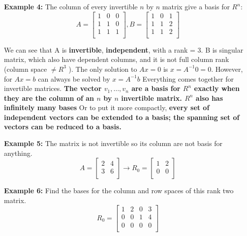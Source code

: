 \textbf{Example 4:} The column of every invertible \(n\) by \(n\) matrix give a basis for \(R^n\):
\[
    A =
    \begin{bmatrix}
        1 & 0 & 0  \\
        1 & 1 & 0  \\
        1 & 1 & 1  \\
    \end{bmatrix}
    , B = 
    \begin{bmatrix}
        1 & 0 & 1  \\
        1 & 1 & 2  \\
        1 & 1 & 2  \\
    \end{bmatrix}
\]    

We can see that A is \textbf{invertible}, \textbf{independent}, with a rank = 3. B is singular matrix, which also have dependent columns, and it is not full column rank (column space \(\neq  R^3\) ). The only solution to \(Ax = 0\) is \(x = A^{-1}0 = 0\). However, for \(Ax = b\) can always be solved by \(x = A^{-1}b\) Everything comes together for invertible matrices. 
 \textbf{The vector \(v_1, \ldots, v_n\) are a basis for \(R^n\) exactly when they are the column of an \(n\) by \(n\) invertible matrix. \(R^n\) also has infinitely many bases}
 Or to put it more compactly, \textbf{every set of independent vectors can be extended to a basis; the spanning set of vectors can be reduced to a basis.} 

 \textbf{Example 5:} The matrix is not invertible so its column are not basis for anything. 
 \[
    A = 
    \begin{bmatrix}
        2 & 4  \\
        3 & 6  \\
    \end{bmatrix}
    \rightarrow
    R_0 = 
    \begin{bmatrix}
        1 & 2  \\
        0 & 0  \\
    \end{bmatrix}
 \] 

 \textbf{Example 6:} Find the bases for the column and row spaces of this rank two matrix. 
 \[
    R_0 = 
    \begin{bmatrix}
        1 & 2 & 0 & 3  \\
        0 & 0 & 1 & 4  \\
        0 & 0 & 0 & 0  \\
    \end{bmatrix}
 \] 

